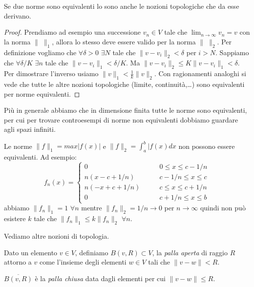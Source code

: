 \begin{lemma}
Se due norme sono equivalenti lo sono anche le nozioni topologiche che da
esse derivano.
\end{lemma}
\begin{proof}
Prendiamo ad esempio una successione $v_n\in V$ tale che
$\lim_{n\to \infty}v_n=v$ con la norma $\|\;\|_1$, allora lo stesso deve
essere valido per la norma $\|\;\|_2$. Per definizione vogliamo che
$\forall \delta>0$ $\exists N$ tale che $\|v-v_i\|_2<\delta$ per $i>N$.
Sappiamo che $\forall \delta/K$ $\exists n$ tale che $\|v-v_i\|_1<\delta/K$.
Ma $\|v-v_i\|_2\leq K\|v-v_i\|_1<\delta$. Per dimostrare l'inverso usiamo
$\|v\|_1<\frac{1}{k}\|v\|_2$.
Con ragionamenti analoghi si vede che tutte le altre nozioni topologiche
(limite, continuità,\ldots) sono equivalenti per norme equivalenti.
\end{proof}
Più in generale abbiamo che in dimensione finita tutte le norme sono
equivalenti, per cui per trovare controesempi di norme non equivalenti
dobbiamo guardare agli spazi infiniti.
\begin{example}
	
Le norme $\|f\|_1=max|f(x)|$ e $\|f\|_2=\int_{a}^b|f(x)dx$ non possono essere
equivalenti. Ad esempio:
\[
f_n(x)=\begin{cases}
0 \qquad &0 \leq x \leq c - 1/n\\
n(x-c+1/n) \qquad &c - 1/n \leq x \leq c\\
n(-x+c+1/n)\qquad &c \leq x \leq c + 1/n\\
0\qquad &c + 1/n \leq x \leq b
\end{cases}
\]
abbiamo $\|f_n\|_1=1$ $\forall n$ mentre $\|f_n\|_2=1/n\to 0$ per
$n\to \infty$ quindi non può esistere $k$ tale che
$\|f_n\|_1\leq k \|f_n\|_2$ $\forall n$.
\end{example}

Vediamo altre nozioni di topologia.\\
\begin{definition}
Dato un elemento $v \in V$, definiamo $B(v,R) \subset V$, la \emph{palla aperta}
di raggio $R$ attorno a $v$ come l'insieme degli elementi $w \in V$ tali
che $\|v-w\| < R$. 
\end{definition}

\begin{definition}
$\overline{B(v,R)}$ è la \emph{palla chiusa} data dagli elementi
per cui $\|v-w\| \leq R$.
\end{definition}

